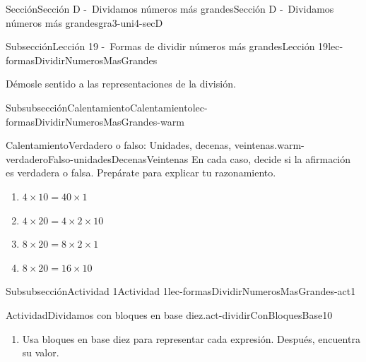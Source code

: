 \documentclass[twoside,10pt,]{article}
\begin{document}
\begin{sectionptx}{Sección}{Sección D -~Dividamos números más grandes}{}{Sección D -~Dividamos números más grandes}{}{}{gra3-uni4-secD}
%
%
\typeout{************************************************}
\typeout{************************************************}
%
\begin{subsectionptx}{Subsección}{Lección 19 -~Formas de dividir números más grandes}{}{Lección 19}{}{}{lec-formasDividirNumerosMasGrandes}
\begin{introduction}{}%
Démosle sentido a las representaciones de la división.%
\end{introduction}%
%
%
\typeout{************************************************}
\typeout{************************************************}
%
\begin{subsubsectionptx}{Subsubsección}{Calentamiento}{}{Calentamiento}{}{}{lec-formasDividirNumerosMasGrandes-warm}
\begin{exploration}{Calentamiento}{Verdadero o falso: Unidades, decenas, veintenas.}{warm-verdaderoFalso-unidadesDecenasVeintenas}%
En cada caso, decide si la afirmación es verdadera o falsa. Prepárate para explicar tu razonamiento.%
%
\begin{enumerate}[label={\Alph*.}]
\item{}\(\displaystyle 4 \times 10 = 40 \times 1\)%
\item{}\(\displaystyle 4 \times 20 = 4 \times 2 \times 10\)%
\item{}\(\displaystyle 8 \times 20 = 8 \times 2 \times 1\)%
\item{}\(\displaystyle 8 \times 20 = 16 \times 10\)%
\end{enumerate}
\end{exploration}%
\end{subsubsectionptx}
%
%
\typeout{************************************************}
\typeout{************************************************}
%
\begin{subsubsectionptx}{Subsubsección}{Actividad 1}{}{Actividad 1}{}{}{lec-formasDividirNumerosMasGrandes-act1}
\begin{activity}{Actividad}{Dividamos con bloques en base diez.}{act-dividirConBloquesBase10}%
\begin{sidebyside}{2}{0}{0}{0.1}%
\begin{sbspanel}{0.7}%
%
\begin{enumerate}
\item{}Usa bloques en base diez para representar cada expresión. Después, encuentra su valor.%
%
\begin{enumerate}

\end{enumerate}
\end{enumerate}
\end{sbspanel}
\end{sidebyside}
\end{activity}
\end{subsubsectionptx}
\end{subsectionptx}
\end{sectionptx}
\end{document}
